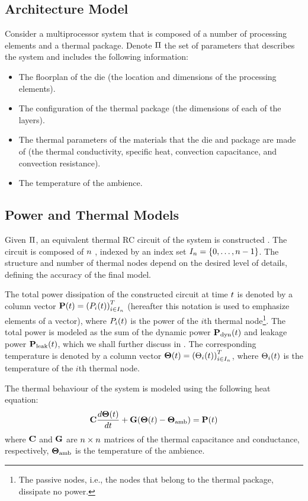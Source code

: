 \subsection{Architecture Model}
Consider a multiprocessor system that is composed of a number of processing elements and a thermal package. Denote $\Pi$ the set of parameters that describes the system and includes the following information:
\begin{itemize}
  \item The floorplan of the die (the location and dimensions of the processing elements).
  \item The configuration of the thermal package (the dimensions of each of the layers).
  \item The thermal parameters of the materials that the die and package are made of (the thermal conductivity, specific heat, convection capacitance, and convection resistance).
  \item The temperature of the ambience.
\end{itemize}

\subsection{Power and Thermal Models}  
Given $\Pi$, an equivalent thermal RC circuit of the system is constructed \cite{kreith2000}. The circuit is composed of $n$ , indexed by an index set $I_n = \{ 0, \dots, n - 1 \}$. The structure and number of thermal nodes depend on the desired level of details, defining the accuracy of the final model.

The total power dissipation of the constructed circuit at time $t$ is denoted by a column vector $\mathbf{P}(t) = \left(P_i(t)\right)^T_{i \in I_n}$ (hereafter this notation is used to emphasize elements of a vector), where $P_i(t)$ is the power of the $i$th thermal node\footnote{The passive nodes, i.e., the nodes that belong to the thermal package, dissipate no power.}. The total power is modeled as the sum of the dynamic power $\mathbf{P}_{\text{dyn}}(t)$ and leakage power $\mathbf{P}_{\text{leak}}(t)$, which we shall further discuss in . The corresponding temperature is denoted by a column vector $\mathbf{\Theta}(t) = \left(\Theta_i(t)\right)^T_{i \in I_n}$, where $\Theta_i(t)$ is the temperature of the $i$th thermal node.

The thermal behaviour of the system is modeled using the following heat equation:
\begin{equation} \equlabel{fourier}
  \mcapacitance \frac{d\vtemp(\time)}{d\time} + \mconductance (\vtemp(\time) - \vtemp_\amb) = \vpower(\time)
\end{equation}
where $\mathbf{C}$ and $\mathbf{G}$ are $n \times n$ matrices of the thermal capacitance and conductance, respectively, $\mathbf{\Theta}_{\text{amb}}$ is the temperature of the ambience.

